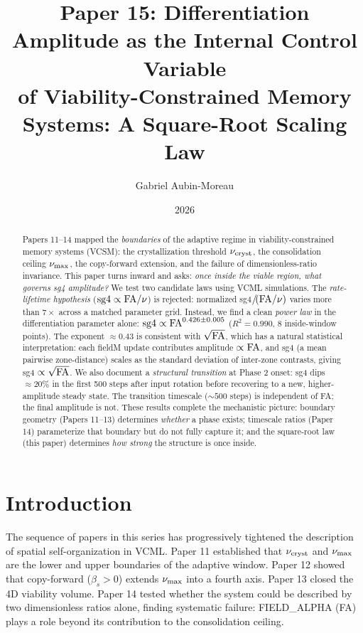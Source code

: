 \documentclass[11pt]{article}
\title{\textbf{Paper 15: Differentiation Amplitude as the Internal Control Variable\\
of Viability-Constrained Memory Systems: A Square-Root Scaling Law}}
\author{Gabriel Aubin-Moreau}
\date{2026}
\begin{document}
\maketitle

\begin{abstract}
Papers 11--14 mapped the \emph{boundaries} of the adaptive regime in
viability-constrained memory systems (VCSM): the crystallization threshold
$\nu_{\rm cryst}$, the consolidation ceiling $\nu_{\rm max}$, the
copy-forward extension, and the failure of dimensionless-ratio invariance.
This paper turns inward and asks: \emph{once inside the viable region,
what governs sg4 amplitude?}
We test two candidate laws using VCML simulations.
The \emph{rate-lifetime hypothesis} (${\rm sg4} \propto {\rm FA}/\nu$) is
rejected: normalized sg4$/\!({\rm FA}/\nu)$ varies more than $7\times$ across
a matched parameter grid.
Instead, we find a clean \emph{power law} in the differentiation parameter
alone: ${\rm sg4} \propto {\rm FA}^{0.426 \pm 0.005}$ ($R^2 = 0.990$,
8 inside-window points).
The exponent $\approx 0.43$ is consistent with $\sqrt{{\rm FA}}$,
which has a natural statistical interpretation: each fieldM update contributes
amplitude $\propto {\rm FA}$, and sg4 (a mean pairwise zone-distance) scales
as the standard deviation of inter-zone contrasts, giving sg4 $\propto
\sqrt{{\rm FA}}$.
We also document a \emph{structural transition} at Phase 2 onset: sg4 dips
$\approx 20\%$ in the first 500 steps after input rotation before recovering
to a new, higher-amplitude steady state.
The transition timescale ($\sim 500$ steps) is independent of FA; the
final amplitude is not.
These results complete the mechanistic picture: boundary geometry
(Papers 11--13) determines \emph{whether} a phase exists;
timescale ratios (Paper 14) parameterize that boundary but do not fully
capture it; and the square-root law (this paper) determines \emph{how strong}
the structure is once inside.
\end{abstract}

\section{Introduction}

The sequence of papers in this series has progressively tightened the
description of spatial self-organization in VCML.
Paper 11 established that $\nu_{\rm cryst}$ and $\nu_{\rm max}$ are the
lower and upper boundaries of the adaptive window.
Paper 12 showed that copy-forward ($\beta_s > 0$) extends $\nu_{\rm max}$
into a fourth axis.
Paper 13 closed the 4D viability volume.
Paper 14 tested whether the system could be described by two dimensionless
ratios alone, finding systematic failure: FIELD\_ALPHA (FA) plays a role
beyond its contribution to the consolidation ceiling.
\end{document}

